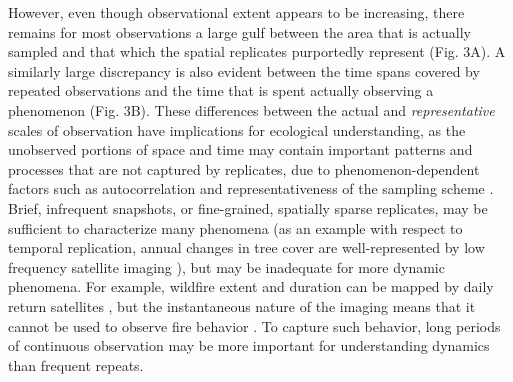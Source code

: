 \documentclass[12pt]{article}
\begin{document}
However, even though observational extent appears to be increasing, there remains for most observations a large gulf between the area that is actually sampled and that which the spatial replicates purportedly represent (Fig. 3A). A similarly large discrepancy is also evident between the time spans covered by repeated observations and the time that is spent actually observing a phenomenon (Fig. 3B). These differences between the actual and \emph{representative} scales of observation have implications for ecological understanding, as the unobserved portions of space and time may contain important patterns and processes that are not captured by replicates, due to phenomenon-dependent factors such as autocorrelation and representativeness of the sampling scheme \cite{underwood_experiments_1997,palmer_scale_1994, cao_comparison_2002, legendre_spatial_1993,collins_method_2000}. Brief, infrequent snapshots, or fine-grained, spatially sparse replicates, may be sufficient to characterize many phenomena (as an example with respect to temporal replication, annual changes in tree cover are well-represented by low frequency satellite imaging \cite{hansen_high-resolution_2013}), but may be inadequate for more dynamic phenomena. For example, wildfire extent and duration can be mapped by daily return satellites \cite{roy_prototyping_2005,jones_fire_2009}, but the instantaneous nature of the imaging means that it cannot be used to observe fire behavior \cite{clements_observing_2007}. To capture such behavior, long periods of continuous observation may be more important for understanding dynamics than frequent repeats. 
\end{document}
